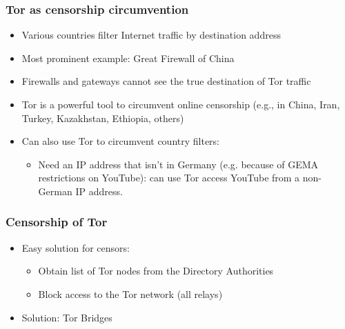 \begin{frame}
  \frametitle{Tor as censorship circumvention}
  \begin{itemize}
    \item Various countries filter Internet traffic by destination address
    \item Most prominent example: Great Firewall of China
    \item<2-> Firewalls and gateways cannot see the true destination of Tor traffic
    \item<2-> Tor is a powerful tool to circumvent online censorship (e.g., in China,
      Iran, Turkey, Kazakhstan, Ethiopia, others)
    \item<3-> Can also use Tor to circumvent country filters:
      \begin{itemize}
      \item Need an IP address that isn't in Germany (e.g. because of GEMA
        restrictions on YouTube): can use Tor access YouTube from a non-German
        IP address.
      \end{itemize}
  \end{itemize}
\end{frame}


\begin{frame}
  \frametitle{Censorship of Tor}
  \begin{itemize}
    \item Easy solution for censors: 
      \begin{itemize}
        \item<2-> Obtain list of Tor nodes from the Directory Authorities
        \item<3-> Block access to the Tor network (all relays)
      \end{itemize}
    \item<4-> Solution: Tor Bridges
  \end{itemize}
\end{frame}


